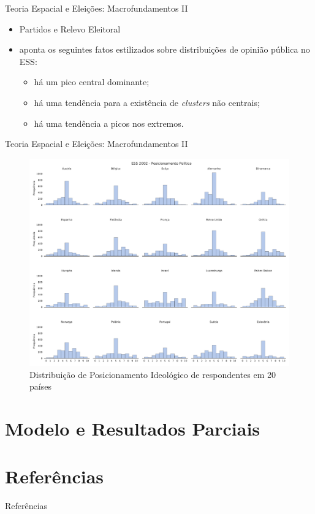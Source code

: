 \documentclass{beamer}
\begin{document}
\begin{frame}{Teoria Espacial e Eleições: Macrofundamentos II}

  \begin{itemize}

  \item Partidos e Relevo Eleitoral
 \item \textcite{flache2017} aponta os seguintes fatos estilizados sobre
   distribuições de opinião pública no ESS:
   
    \begin{itemize}

    \item  há um pico central dominante;
    \item há uma tendência para a existência de \textit{clusters} não centrais;
    \item há uma tendência a picos nos extremos.
      
    \end{itemize}
    
  \end{itemize}
  
\end{frame}

\begin{frame}{Teoria Espacial e Eleições: Macrofundamentos II}  
  \begin{figure}[H]
      \centering \includegraphics[scale = 0.2]{ims/ess_2002_plots.pdf}
    \caption{ Distribuição de Posicionamento Ideológico de respondentes em 20
      países}
    \label{fig2}
  \end{figure}
\end{frame}


\section{Modelo e Resultados Parciais}


\section*{Referências}
\begin{frame}[allowframebreaks]{Referências}
\printbibliography[heading=none]
\end{frame}
\end{document}
